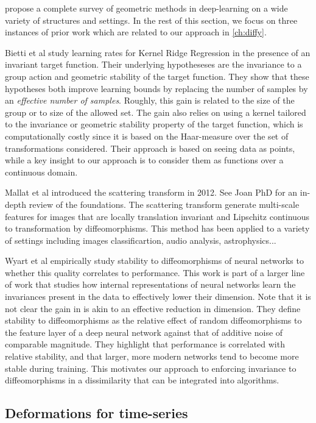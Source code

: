 \cite{bronstein-geometric-deep-learning} propose a complete survey of geometric methods in deep-learning on a wide variety of structures and settings. In the rest of this section, we focus on three instances of prior work which are related to our approach in \cref{ch:diffy}.

Bietti et al study learning rates for Kernel Ridge Regression in the presence of an invariant target function. Their underlying hypotheseses are the invariance to a group action and geometric stability of the target function. They show that these hypotheses both improve learning bounds by replacing the number of samples by an \emph{effective number of samples}. Roughly, this gain is related to the size of the group or to size of the allowed set. The gain also relies on using a kernel tailored to the invariance or geometric stability property of the target function, which is computationally costly since it is based on the Haar-measure over the set of transformations considered. Their approach is based on seeing data as points, while a key insight to our approach is to consider them as functions over a continuous domain.

Mallat et al introduced the scattering transform in 2012. See Joan PhD for an in-depth review of the foundations. The scattering transform generate multi-scale features for images that are locally translation invariant and Lipschitz continuous to transformation by diffeomorphisms. This method has been applied to a variety of settings including images classificartion, audio analysis, astrophysics...

Wyart et al empirically study stability to diffeomorphisms of neural networks to whether this quality correlates to performance.
This work is part of a larger line of work that studies how internal representations of neural networks learn the invariances present in the data to effectively lower their dimension. Note that it is not clear the gain in \cite{bietti} is akin to an effective reduction in dimension. They define stability to diffeomorphisms as the relative effect of random diffeomorphisms to the feature layer of a deep neural network against that of additive noise of comparable magnitude. They highlight that performance is correlated with relative stability, and that larger, more modern networks tend to become more stable during training. This motivates our approach to enforcing invariance to diffeomorphisms in a dissimilarity that can be integrated into algorithms.

\subsection{Deformations for time-series}

